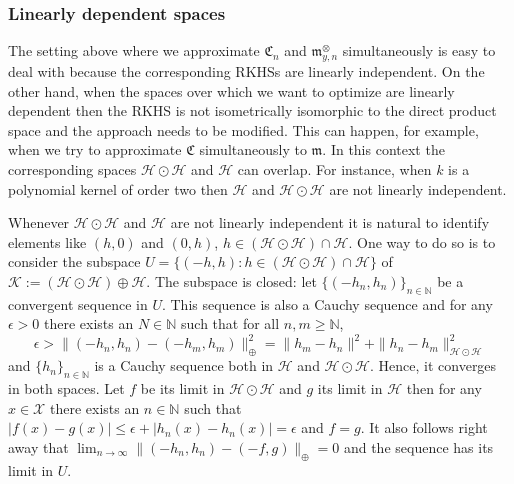 \documentclass[AHL,Unicode,longabstracts,published]{cedram}
\theoremstyle{remark}
\newcommand{\bbN}{\mathbb{N}}
\newcommand{\X}{\mathcal{X}}
\newcommand{\cH}{\mathcal{H}}
\newcommand{\clK}{\mathcal{K}}
\newcommand{\fkC}{\mathfrak{C}}
\newcommand{\mean}{\mathfrak{m}}
\begin{document}
\subsubsection{Linearly dependent spaces} \label{sec:quotient_lin_dep}
The setting above where we approximate $\fkC_n$ and $\mean^\otimes_{y,n}$ simultaneously is easy to deal with because the corresponding RKHSs are linearly independent. On the other hand, when the spaces over which we want to optimize are linearly dependent then the RKHS is not isometrically isomorphic to the direct product space and the approach needs to be modified. This can happen, for example, when we try to approximate $\fkC$ simultaneously to $\mean$. In this context the corresponding spaces $\cH \odot \cH$ and $\cH$ can overlap. For instance, when $k$ is a polynomial kernel of order two then $\cH$ and $\cH \odot \cH$ are not linearly independent.


Whenever $\cH \odot \cH$ and $\cH$ are not linearly independent it is natural to identify elements like $(h,0)$ and $(0,h)$, $h\in (\cH \odot \cH) \cap \cH$. One way to do so is to consider the subspace $U = \{(-h,h) : h \in (\cH \odot \cH) \cap \cH \}$ of $\clK:= (\cH \odot \cH) \oplus \cH$. The subspace is closed: let $\{(-h_n,h_n)\}_{n \in \bbN}$ be a convergent sequence in $U$. This sequence is also a Cauchy sequence and for any $\epsilon >0$ there exists an $N \in \bbN$ such that for all $n,m \geq \bbN$,
\[
\epsilon > \| (-h_n,h_n) - (-h_m,h_m)\|_\oplus^2 = \|h_m - h_n\|^2 + \|h_n -h_m\|^2_{\cH \odot \cH}
\]
and $\{h_n\}_{n\in \bbN}$ is a Cauchy sequence both in $\cH$ and $\cH \odot \cH$. Hence, it converges in both spaces. Let $f$ be its limit in $\cH \odot \cH$ and $g$ its limit in $\cH$ then for any $x \in \X$ there exists an $n\in\bbN$ such that $|f(x) - g(x)| \leq \epsilon + |h_n(x) - h_n(x)| = \epsilon$ and $f = g$. It also follows right away that $\lim_{n\rightarrow \infty} \|(-h_n,h_n) - (-f,g)\|_\oplus = 0 $ and the sequence has its limit in $U$.
\end{document}
